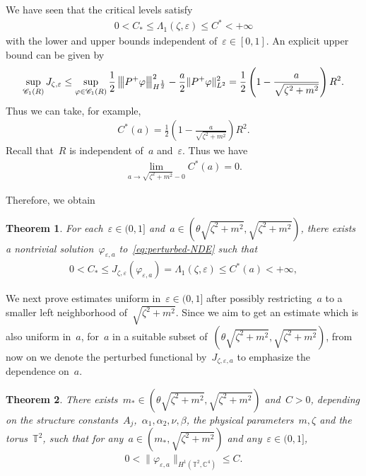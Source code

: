 \documentclass[10pt,a4paper]{amsart}
\newcommand{\tnorm}[1]{%
  \left\vert\kern-0.3ex\left\vert\kern-0.3ex\left\vert #1 \right\vert\kern-0.3ex\right\vert\kern-0.3ex\right\vert
}
\newcommand{\C}{\mathbb{C}}
\newcommand{\T}{\mathbb{T}}
\newcommand{\eps}{\varepsilon}
\newcommand{\parenthesis}[1]{\left(#1\right)} %
\newtheorem{thm}{Theorem}[section]
\begin{document}
We have seen that the critical levels satisfy
\begin{align}
    0<C_*\leq \Lambda_1(\zeta,\eps) \leq C^*<+\infty
\end{align}
with the lower and upper bounds independent of~$\eps\in [0,1]$. 
An explicit upper bound can be given by 
\begin{align}
    \sup_{\mathscr{C}_1(R)} J_{\zeta,\eps} 
    \leq \sup_{ \varphi\in \mathscr{C}_1(R)} \frac{1}{2}\tnorm{P^+\varphi}_{H^{\frac{1}{2}}}^2 - \frac{a}{2}\|P^+\varphi\|_{L^2}^2 = \frac{1}{2}\parenthesis{1-\frac{a}{\sqrt{\zeta^2+m^2}}}R^2. 
\end{align}
Thus we can take, for example,
\begin{align}
    C^*(a)= \frac{1}{2}\parenthesis{1-\frac{a}{\sqrt{\zeta^2+m^2}}}R^2. 
\end{align}
Recall that~$R$ is independent of~$a$ and~$\eps$.
Thus we have 
\begin{align}\label{eq:upper-level-estimate}
    \lim_{a\to \sqrt{\zeta^2+m^2}-0} C^*(a)=0.
\end{align}

Therefore, we obtain
\begin{thm}\label{thm:existence for perturbed NDE}
    For each~$\eps\in (0,1]$ and~$a\in (\theta\sqrt{\zeta^2+m^2},\sqrt{\zeta^2+m^2})$, there exists a nontrivial solution~$\varphi_{\eps,a}$ to~\eqref{eq:perturbed-NDE} such that
    \begin{align}
        0<C_* \leq J_{\zeta,\eps}(\varphi_{\eps,a})=\Lambda_1(\zeta,\eps)\leq C^*(a)<+\infty,
    \end{align}
\end{thm}

We next prove estimates uniform in~$\eps\in (0,1]$ after possibly restricting~$a$ to a smaller left neighborhood of~$\sqrt{\zeta^2+m^2}$. 
Since we aim to get an estimate which is also uniform in~$a$, for~$a$ in a suitable subset of~$(\theta\sqrt{\zeta^2+m^2},\sqrt{\zeta^2+m^2})$, from now on we denote the perturbed functional by~$J_{\zeta,\eps,a}$ to emphasize the dependence on~$a$. 


\begin{thm}\label{thm:uniform estimate}
    There exists~$m_*\in (\theta\sqrt{\zeta^2+m^2},\sqrt{\zeta^2+m^2})$ and~$C>0$, depending on the structure constants~$A_j$,~$\alpha_1,\alpha_2,\nu,\beta$, the physical parameters~$m,\zeta$ and the torus~$\T^2$, such that for any~$a\in (m_*, \sqrt{\zeta^2+m^2})$ and any~$\eps\in (0,1]$, 
    \begin{align}\label{eq:uniform estimate}
         0<\|\varphi_{\eps,a}\|_{H^1(\T^2,\C^4)}\leq C. 
    \end{align}
\end{thm}
\end{document}
